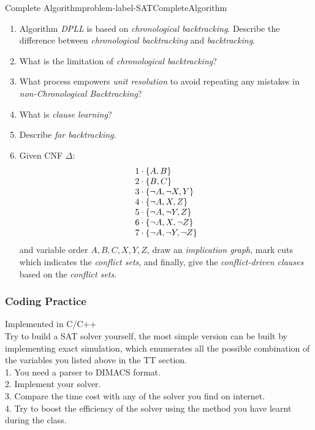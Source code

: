 \documentclass[main.tex]{subfiles}
\begin{document}
\begin{problem}{Complete Algorithm}{problem-label-SATCompleteAlgorithm}
\begin{enumerate}[(1)]
\[    \]
    \item Algorithm \textit{DPLL} is based on \textit{chronological backtracking}. Describe the difference between \textit{chronological backtracking} and \textit{backtracking}.
    \item What is the limitation of \textit{chronological backtracking}?
    \item What process empowers \textit{unit resolution} to avoid repeating any mistakes in \textit{non-Chronological Backtracking}?
    \item What is \textit{clause learning}?
    \item Describe \textit{far backtracking}.
    \item Given CNF $\Delta$:
    \[
        \begin{array}{l l}{1\cdot\{A,B\}}\\ {2\cdot\{B,C\}}\\ {3\cdot\{\lnot A, \lnot X, Y\}}\\{4\cdot\{\lnot A, X, Z\}}\\ {5\cdot\{\lnot A,\lnot Y,Z\}}\\ {6\cdot\{\lnot A, X, \lnot Z\}}\\ {7\cdot\{\lnot A,\lnot Y,\lnot Z\}}\end{array}
    \]
    and variable order $A, B, C, X, Y, Z$, draw an \textit{implication graph}, mark cuts which indicates the \textit{conflict sets}, and finally, give the \textit{conflict-driven clauses} based on the \textit{conflict sets}.
    
\end{enumerate}
\end{problem}
\vspace*{4\baselineskip}

\vspace*{4\baselineskip}
\subsubsection{Coding Practice}
Implemented in C/C++\\
Try to build a SAT solver yourself, the most simple version can be built by implementing exact simulation, which enumerates all the possible combination of the variables you listed above in the TT section.\\
1. You need a parser to DIMACS format.\\
2. Implement your solver.\\
3. Compare the time cost with any of the solver you find on internet.\\
4. Try to boost the efficiency of the solver using the method you have learnt during the class.
\end{document}
